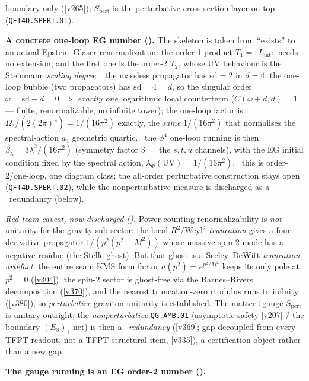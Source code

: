 \documentclass[11pt,a4paper]{article}
\begin{document}
\begin{keybox}
boundary-only (\vref{v265}); $S_{\mathrm{pert}}$ is the perturbative cross-section layer on top
(\texttt{QFT4D.SPERT.01}).
\par\smallskip\noindent\textbf{A concrete one-loop EG number ().}
The skeleton is taken from ``exists'' to an actual Epstein--Glaser renormalization: the order-1 product
$T_1={:}L_{\mathrm{int}}{:}$ needs no extension, and the first one is the order-2 $T_2$, whose UV behaviour is
the Steinmann \emph{scaling degree}. \mE\ the massless propagator has $\mathrm{sd}=2$ in $d=4$, the one-loop
bubble (two propagators) has $\mathrm{sd}=4=d$, so the singular order $\omega=\mathrm{sd}-d=0$ $\Rightarrow$
\emph{exactly one} logarithmic local counterterm ($C(\omega{+}d,d)=1$ --- finite, renormalizable, no infinite
tower); the one-loop factor is $\Omega_3/(2(2\pi)^4)=1/(16\pi^2)$ exactly, the \emph{same} $1/(16\pi^2)$ that
normalises the spectral-action $a_4$ geometric quartic. \mC\ the $\phi^4$ one-loop running is then
$\beta_\lambda=3\lambda^2/(16\pi^2)$ (symmetry factor $3=$ the $s,t,u$ channels), with the EG initial condition
fixed by the spectral action, $\lambda_\Phi(\mathrm{UV})=1/(16\pi^2)$. \mO\ this is order-2/one-loop, one
diagram class; the all-order perturbative construction stays open (\texttt{QFT4D.SPERT.02}), while the
nonperturbative measure is discharged as a \mC\ redundancy (below).
\par\smallskip\noindent\emph{Red-team caveat, now discharged ().} Power-counting
renormalizability is \emph{not} unitarity for the gravity sub-sector: the local $R^2/$Weyl$^2$ \emph{truncation}
gives a four-derivative propagator $1/(p^2(p^2+M^2))$ whose massive spin-2 mode has a negative residue (the Stelle
ghost). But that ghost is a Seeley--DeWitt \emph{truncation artefact}: the entire seam KMS form factor
$a(p^2){=}e^{p^2/M^2}$ keeps its only pole at $p^2{=}0$ (\vref{v304}), the spin-2 sector is ghost-free via the
Barnes--Rivers decomposition (\vref{v370}), and the nearest truncation-zero modulus runs to infinity (\vref{v380}),
so \emph{perturbative} graviton unitarity is established. The matter$+$gauge $S_{\mathrm{pert}}$ is unitary outright;
the \emph{nonperturbative} \texttt{QG.AMB.01} (asymptotic safety \vref{v207} / the boundary $(E_8)_1$ net) is then a
\mC\ \emph{redundancy} (\vref{v369}; gap-decoupled from every TFPT readout, not a TFPT structural item, \vref{v335}),
a certification object rather than a new gap.
\par\smallskip\noindent\textbf{The gauge running is an EG order-2 number ().}

\end{keybox}
\end{document}
